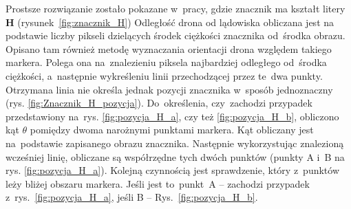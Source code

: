 Prostsze rozwiązanie zostało pokazane w~pracy\cite{H}, gdzie znacznik ma kształt litery \textbf{H} (rysunek~\ref{fig:znacznik_H}) 
Odległość drona od lądowiska obliczana jest na podstawie liczby pikseli dzielących środek ciężkości znacznika od~środka obrazu. 
Opisano tam również metodę wyznaczania orientacji drona względem takiego markera. 
Polega ona na~znalezieniu piksela najbardziej odległego od~środka ciężkości, a~następnie wykreśleniu linii przechodzącej przez te~dwa punkty.  %
Otrzymana linia nie określa jednak pozycji znacznika w~sposób jednoznaczny (rys. \ref{fig:Znacznik_H_pozycja}). 
Do~określenia, czy~zachodzi przypadek przedstawiony na~rys. \ref{fig:pozycja_H_a}, czy też \ref{fig:pozycja_H_b}, obliczono kąt $\theta$ pomiędzy dwoma narożnymi punktami markera. %
Kąt obliczany jest na~podstawie zapisanego obrazu znacznika. 
Następnie wykorzystując znalezioną wcześniej linię, obliczane są współrzędne tych dwóch punktów (punkty A i~B na rys. \ref{fig:pozycja_H_a}). 
Kolejną czynnością jest sprawdzenie, który z~punktów leży bliżej obszaru markera. %
Jeśli jest to~punkt~A -- zachodzi przypadek z~rys.~\ref{fig:pozycja_H_a}, jeśli B -- Rys.~\ref{fig:pozycja_H_b}.
